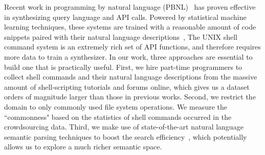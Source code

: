 Recent work in programming by natural language (PBNL)~\cite{DBLP:journals/pvldb/LiJ14,DBLP:journals/corr/DesaiGHJKMRR15,DBLP:conf/acl/QuirkMG15} has proven effective in synthesizing query language and API calls. Powered by statistical machine learning techniques, these systems are trained with a reasonable amount of code snippets paired with their natural language descriptions~\cite{DBLP:conf/mobisys/LeGS13,DBLP:journals/corr/DesaiGHJKMRR15}, The UNIX shell command system is an extremely rich set of API functions, and therefore requires more data to train a synthesizer. In our work, three approaches are essential to build one that is practically useful. First, we hire part-time programmers to collect shell commands and their natural language descriptions from the massive amount of shell-scripting tutorials and forums online, which gives us a dataset orders of magnitude larger than those in previous works. Second, we restrict the domain to only commonly used file system operations. We measure the ``commonness" based on the statistics of shell commands occurred in the crowdsourcing data. Third, we make use of state-of-the-art natural language semantic parsing techniques to boost the search efficiency~\cite{Zettlemoyer05learningto,lewis2015joint}, which potentially allows us to explore a much richer semantic space.


